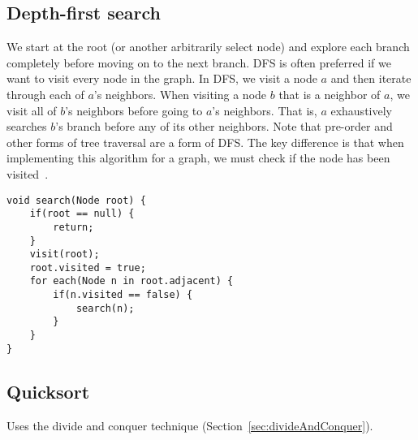 \documentclass[a4paper, 11.25pt]{article}
\begin{document}
\subsection{Depth-first search}
\label{sec:dfs}
We start at the root (or another arbitrarily select node) and explore each branch completely before moving on to the next branch. DFS is often preferred if we want to visit every node in the graph. In DFS, we visit a node $a$ and then iterate through each of $a$'s neighbors. When visiting a node $b$ that is a neighbor of $a$, we visit all of $b$'s neighbors before going to $a$'s neighbors. That is, $a$ exhaustively searches $b$'s branch before any of its other neighbors. Note that pre-order and other forms of tree traversal are a form of DFS. The key difference is that when implementing this algorithm for a graph, we must check if the node has been visited~\cite{Cracking2015}.
\begin{lstlisting}[style=CStyle]
void search(Node root) {
    if(root == null) {
        return;
    }
    visit(root);
    root.visited = true;
    for each(Node n in root.adjacent) {
        if(n.visited == false) {
            search(n);
        }
    }
}\end{lstlisting}  

\subsection{Quicksort}
Uses the divide and conquer technique (Section~\ref{sec:divideAndConquer}).
\end{document}
